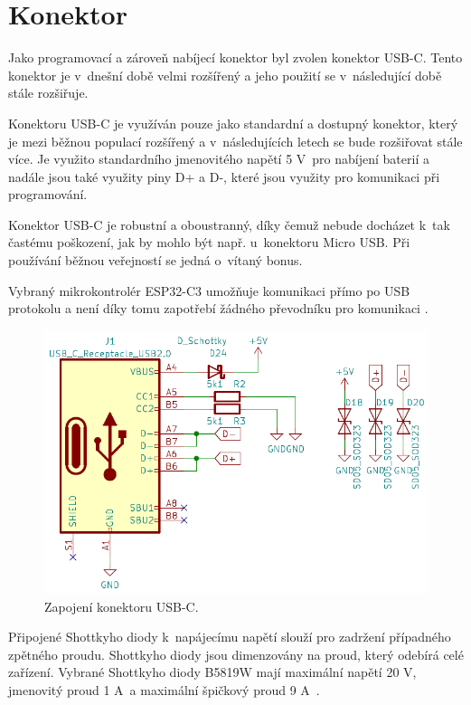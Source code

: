 \section{Konektor}
Jako programovací a zároveň nabíjecí konektor byl zvolen konektor USB-C. Tento konektor je v~dnešní době velmi rozšířený a jeho použití se v~následující době stále rozšiřuje. 

Konektoru USB-C je využíván pouze jako standardní a dostupný konektor, který je mezi běžnou
populací rozšířený a v~následujících letech se bude rozšiřovat stále více. Je využito standardního jmenovitého napětí 5 V~pro nabíjení baterií a nadále jsou také využity 
piny D+ a D-, které jsou využity pro komunikaci při programování. 

Konektor USB-C je robustní a oboustranný, díky čemuž nebude docházet k~tak častému poškození, jak by mohlo být např. u~konektoru Micro USB. Při používání běžnou veřejností
se jedná o~vítaný bonus. 

Vybraný mikrokontrolér ESP32-C3 umožňuje komunikaci přímo po USB protokolu a není díky tomu zapotřebí žádného převodníku pro komunikaci \cite{ESP_C3_dtsh}.

\begin{figure}[!h]
  \begin{center}
    \includegraphics[scale=0.5]{obrazky/USB_C.png}
  \end{center}
  \caption[Zapojení konektoru USB-C]{Zapojení konektoru USB-C.}
\end{figure}

Připojené Shottkyho diody k~napájecímu napětí slouží pro zadržení případného zpětného proudu. Shottkyho diody jsou dimenzovány na proud, který odebírá celé zařízení. Vybrané 
Shottkyho diody  B5819W mají maximální napětí 20 V, jmenovitý proud 1 A~a maximální špičkový proud 9 A~\cite{shotky_dtsh}.

